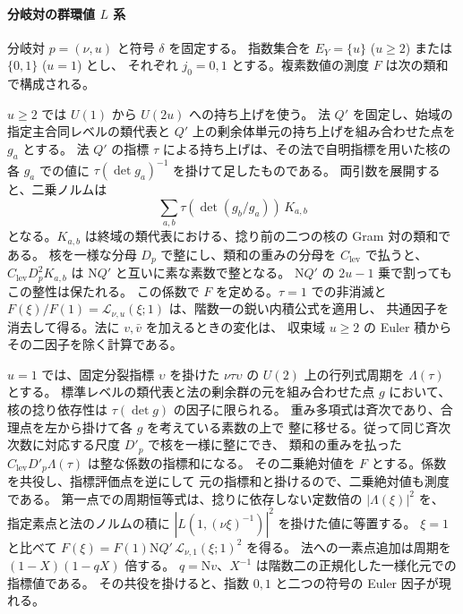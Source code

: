 \paragraph{分岐対の群環値 \(L\) 系}
分岐対 \(p=(\nu,u)\) と符号 \(\delta\) を固定する。
指数集合を \(E_Y=\{u\}\) (\(u\ge2\)) または \(\{0,1\}\) (\(u=1\)) とし、
それぞれ \(j_0=0,1\) とする。複素数値の測度 \(F\) は次の類和で構成される。

\(u\ge2\) では \(U(1)\) から \(U(2u)\) への持ち上げを使う。
法 \(Q'\) を固定し、始域の指定主合同レベルの類代表と
\(Q'\) 上の剰余体単元の持ち上げを組み合わせた点を \(g_a\) とする。
法 \(Q'\) の指標 \(\tau\) による持ち上げは、その法で自明指標を用いた核の
各 \(g_a\) での値に \(\tau(\det g_a)^{-1}\) を掛けて足したものである。
両引数を展開すると、二乗ノルムは
\[
 \sum_{a,b}\tau(\det(g_b/g_a))\,K_{a,b}
\]
となる。\(K_{a,b}\) は終域の類代表における、捻り前の二つの核の Gram 対の類和である。
核を一様な分母 \(D_p\) で整にし、類和の重みの分母を \(C_{\mathrm{lev}}\) で払うと、
\(C_{\mathrm{lev}}D_p^2K_{a,b}\) は \(\mathrm NQ'\) と互いに素な素数で整となる。
\(\mathrm NQ'\) の \(2u-1\) 乗で割ってもこの整性は保たれる。
この係数で \(F\) を定める。\(\tau=1\) での非消滅と
\(F(\xi)/F(1)=\mathcal L_{\nu,u}(\xi;1)\) は、階数一の鋭い内積公式を適用し、
共通因子を消去して得る。法に \(v,\bar v\) を加えるときの変化は、
収束域 \(u\ge2\) の Euler 積からその二因子を除く計算である。

\(u=1\) では、固定分裂指標 \(\upsilon\) を掛けた
\(\nu\tau\upsilon\) の \(U(2)\) 上の行列式周期を \(\Lambda(\tau)\) とする。
標準レベルの類代表と法の剰余群の元を組み合わせた点 \(g\) において、
核の捻り依存性は \(\tau(\det g)\) の因子に限られる。
重み多項式は斉次であり、合理点を左から掛けて各 \(g\) を考えている素数の上で
整に移せる。従って同じ斉次次数に対応する尺度 \(D'_p\) で核を一様に整にでき、
類和の重みを払った \(C_{\mathrm{lev}}D'_p\Lambda(\tau)\) は整な係数の指標和になる。
その二乗絶対値を \(F\) とする。係数を共役し、指標評価点を逆にして
元の指標和と掛けるので、二乗絶対値も測度である。
第一点での周期恒等式は、捻りに依存しない定数倍の \(|\Lambda(\xi)|^2\) を、
指定素点と法のノルムの積に \(|L(1,(\nu\xi)^{-1})|^2\) を掛けた値に等置する。
\(\xi=1\) と比べて
\(F(\xi)=F(1)\mathrm NQ'\,\mathcal L_{\nu,1}(\xi;1)^2\) を得る。
法への一素点追加は周期を \((1-X)(1-qX)\) 倍する。
\(q=\mathrm Nv\)、\(X^{-1}\) は階数二の正規化した一様化元での指標値である。
その共役を掛けると、指数 \(0,1\) と二つの符号の Euler 因子が現れる。

